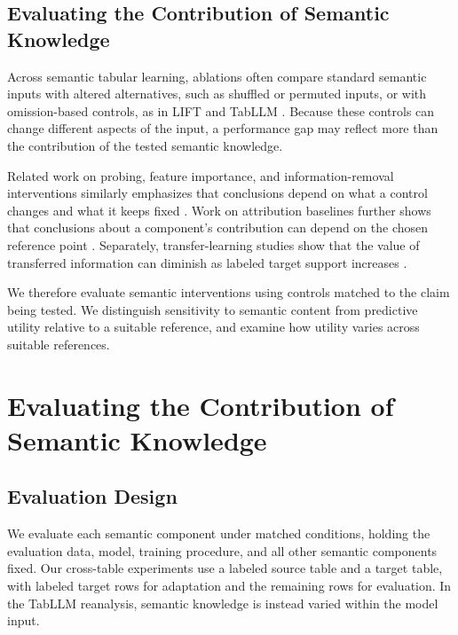 \documentclass{article} %
\begin{document}
\subsection{Evaluating the Contribution of Semantic Knowledge}

Across semantic tabular learning, ablations often compare standard semantic inputs with altered alternatives, such as shuffled or permuted inputs, or with omission-based controls, as in LIFT and TabLLM \citep{dinh2022lift,hegselmann2023tabllm}.
Because these controls can change different aspects of the input, a performance gap may reflect more than the contribution of the tested semantic knowledge.

Related work on probing, feature importance, and information-removal interventions similarly emphasizes that conclusions depend on what a control changes and what it keeps fixed \citep{hewitt2019designing,fisher2019all,elazar2021amnesic}.
Work on attribution baselines further shows that conclusions about a component's contribution can depend on the chosen reference point \citep{sturmfels2020visualizing}.
Separately, transfer-learning studies show that the value of transferred information can diminish as labeled target support increases \citep{he2019rethinking,tripuraneni2020theory,zoph2020rethinking,nguyen2020leep}.

We therefore evaluate semantic interventions using controls matched to the claim being tested. 
We distinguish sensitivity to semantic content from predictive utility relative to a suitable reference, and examine how utility varies across suitable references.

\section{Evaluating the Contribution of Semantic Knowledge}
\label{sec:method}

\subsection{Evaluation Design}
\label{sec:evaluation_design}

We evaluate each semantic component under matched conditions, holding the evaluation data, model, training procedure, and all other semantic components fixed.
Our cross-table experiments use a labeled source table and a target table, with labeled target rows for adaptation and the remaining rows for evaluation.
In the TabLLM reanalysis, semantic knowledge is instead varied within the model input.
\end{document}
